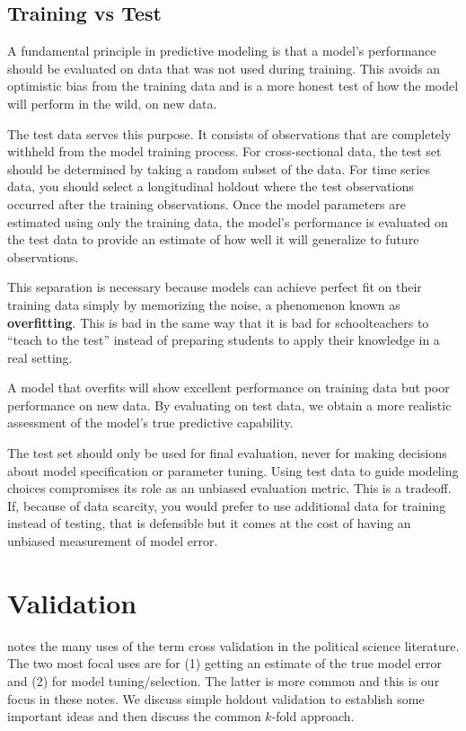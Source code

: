 \subsection{Training vs Test}

A fundamental principle in predictive modeling is that a model's performance should be evaluated on data that was not used during training. This avoids an optimistic bias from the training data and is a more honest test of how the model will perform in the wild, on new data. 

The test data serves this purpose. It consists of observations that are completely withheld from the model training process. For cross-sectional data, the test set should be determined by taking a random subset of the data. For time series data, you should select a longitudinal holdout where the test observations occurred after the training observations.  
Once the model parameters are estimated using only the training data, the model's performance is evaluated on the test data to provide an estimate of how well it will generalize to future observations.

This separation is necessary because models can achieve perfect fit on their training data simply by memorizing the noise, a phenomenon known as \textbf{overfitting}. 
This is bad in the same way that it is bad for schoolteachers to ``teach to the test'' instead of preparing students to apply their knowledge in a real setting. 

A model that overfits will show excellent performance on training data but poor performance on new data. By evaluating on test data, we obtain a more realistic assessment of the model's true predictive capability.

The test set should only be used for final evaluation, never for making decisions about model specification or parameter tuning. Using test data to guide modeling choices compromises its role as an unbiased evaluation metric.
This is a tradeoff. If, because of data scarcity, you would prefer to use additional data for training instead of testing, that is defensible but it comes at the cost of having an unbiased measurement of model error. 

\section{Validation}

\cite{neunhoeffer2019cross} notes the many uses of the term cross validation in the political science literature. The two most focal uses are for (1) getting an estimate of the true model error
and (2) for model tuning/selection. The latter is more common and this is our focus in these notes. We discuss simple holdout validation to establish some important ideas and then discuss the common $k$-fold approach. 


